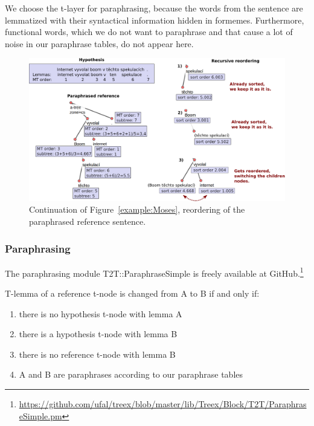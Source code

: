 \documentclass[11pt]{article}
\def\Fref#1{Figure~\ref{#1}}
\def\footurl#1{\footnote{\url{#1}}}
\begin{document}
We choose the t-layer for paraphrasing, because the words from the sentence 
are lemmatized with their syntactical information hidden in formemes. 
Furthermore, functional words, which we do not want to paraphrase and that 
cause a lot of noise in our paraphrase tables, do not appear here.
\begin{figure}[tb]
\begin{center}
\includegraphics[scale=0.32]{reordering.png} 
\caption{Continuation of \Fref{example:Moses}, reordering of the paraphrased reference
sentence.}
\label{reordering}
\end{center}
\end{figure}

\subsubsection{Paraphrasing}
The paraphrasing module T2T::ParaphraseSimple is freely available at 
GitHub.\footurl{https://github.com/ufal/treex/blob/master/lib/Treex/Block/T2T/ParaphraseSimple.pm} 

T-lemma of a reference t-node is changed from A to B if and only if:
\begin{enumerate}
\item there is no hypothesis t-node with lemma A
\item there is a hypothesis t-node with lemma B 
\item there is no reference t-node with lemma B
\item A and B are paraphrases according to our paraphrase tables
\end{enumerate}
\end{document}
